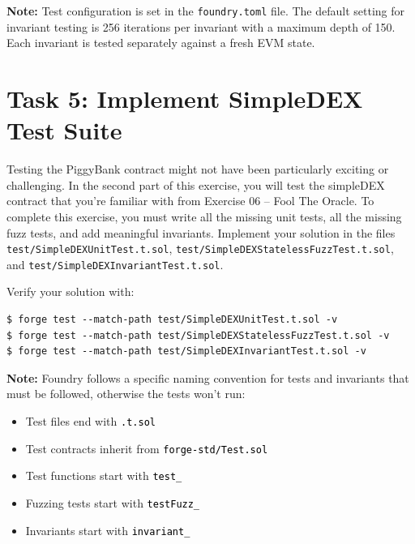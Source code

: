 \documentclass[12pt]{article}
\newcommand{\codegrey}[1]{%
  \texttt{\colorbox{black!4}{\textcolor{black}{#1}}}%
}
\begin{document}
\noindent
\textbf{Note:} Test configuration is set in the \texttt{foundry.toml} file. The default setting for invariant testing is 256 iterations per invariant with a maximum depth of 150. Each invariant is tested separately against a fresh EVM state.

\section*{Task 5: Implement SimpleDEX Test Suite}

Testing the PiggyBank contract might not have been particularly exciting or
challenging. In the second part of this exercise, you will test the simpleDEX
contract that you're familiar with from Exercise 06 -- Fool The Oracle. To
complete this exercise, you must write all the missing unit tests, all the
missing fuzz tests, and add meaningful invariants. Implement your solution in
the files \texttt{test/SimpleDEXUnitTest.t.sol},
\texttt{test/SimpleDEXStatelessFuzzTest.t.sol}, and
\texttt{test/SimpleDEXInvariantTest.t.sol}.

\medskip
\noindent
Verify your solution with:

\noindent \begin{minipage}{\textwidth}
    \begin{verbatim}
$ forge test --match-path test/SimpleDEXUnitTest.t.sol -v
$ forge test --match-path test/SimpleDEXStatelessFuzzTest.t.sol -v
$ forge test --match-path test/SimpleDEXInvariantTest.t.sol -v
\end{verbatim}
\end{minipage}

\noindent
\textbf{Note:} Foundry follows a specific naming convention for tests and invariants that must be followed, otherwise the tests won't run:

\begin{itemize}
    \item Test files end with \codegrey{.t.sol}
    \item Test contracts inherit from \codegrey{forge-std/Test.sol}
    \item Test functions start with \codegrey{test\_}
    \item Fuzzing tests start with \codegrey{testFuzz\_}
    \item Invariants start with \codegrey{invariant\_}
\end{itemize}
\end{document}
